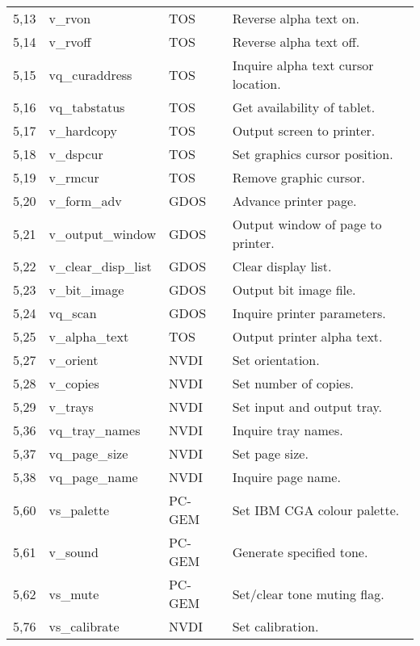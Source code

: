 \documentclass[a4paper]{article}
\begin{document}
\begin{supertabular}{|p{1.8cm}|p{3.0cm}|p{1.5cm}|p{8.7cm}|}
5,13            & v\_rvon             & TOS   & Reverse alpha text on. \\
5,14            & v\_rvoff            & TOS   & Reverse alpha text off. \\
5,15            & vq\_curaddress      & TOS   & Inquire alpha text cursor location. \\
5,16            & vq\_tabstatus       & TOS   & Get availability of tablet. \\
5,17            & v\_hardcopy         & TOS   & Output screen to printer. \\
5,18            & v\_dspcur           & TOS   & Set graphics cursor position. \\
5,19            & v\_rmcur            & TOS   & Remove graphic cursor. \\
5,20            & v\_form\_adv        & GDOS  & Advance printer page. \\
5,21            & v\_output\_window   & GDOS  & Output window of page to printer. \\
5,22            & v\_clear\_disp\_list& GDOS  & Clear display list. \\
5,23            & v\_bit\_image       & GDOS  & Output bit image file. \\
5,24            & vq\_scan            & GDOS  & Inquire printer parameters. \\
5,25            & v\_alpha\_text      & TOS   & Output printer alpha text. \\
5,27            & v\_orient           & NVDI  & Set orientation.\\
5,28            & v\_copies           & NVDI  & Set number of copies.\\
5,29            & v\_trays            & NVDI  & Set input and output tray.\\
5,36            & vq\_tray\_names     & NVDI  & Inquire tray names.\\
5,37            & vq\_page\_size      & NVDI  & Set page size.\\
5,38            & vq\_page\_name      & NVDI  & Inquire page name.\\
5,60            & vs\_palette         & PC-GEM& Set IBM CGA colour palette. \\
5,61            & v\_sound            & PC-GEM& Generate specified tone. \\
5,62            & vs\_mute            & PC-GEM& Set/clear tone muting flag. \\
5,76            & vs\_calibrate       & NVDI  & Set calibration.\\

\end{supertabular}
\end{document}
